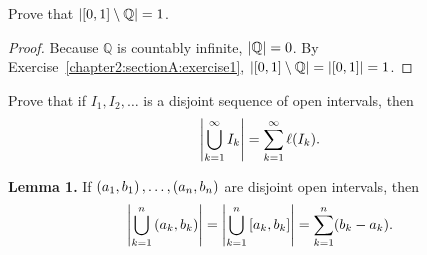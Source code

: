 \begin{exercise}\label{chapter2:sectionA:exercise10}
    Prove that $\left\vert{\left[{0, 1}\right]\setminus\mathbb{Q}}\right\vert = 1$.
\end{exercise}

\begin{proof}
    Because $\mathbb{Q}$ is countably infinite, $\left\vert{\mathbb{Q}}\right\vert = 0$. By Exercise~\ref{chapter2:sectionA:exercise1}, $\left\vert{\left[{0, 1}\right]\setminus\mathbb{Q}}\right\vert = \left\vert{\left[{0, 1}\right]}\right\vert = 1$.
\end{proof}
\newpage

\begin{exercise}\label{chapter2:sectionA:exercise11}
    Prove that if $I_{1}, I_{2}, \ldots$ is a disjoint sequence of open intervals, then
    \[
        \left\vert{\bigcup^{\infty}_{k=1}I_{k}}\right\vert = \sum^{\infty}_{k=1}\ell(I_{k}).
    \]
\end{exercise}

\noindent\textbf{Lemma 1.} If $\left({a_{1}, b_{1}}\right), \ldots, \left({a_{n}, b_{n}}\right)$ are disjoint open intervals, then
\[
    \left\vert{\bigcup^{n}_{k=1}\left({a_{k}, b_{k}}\right)}\right\vert = \left\vert{\bigcup^{n}_{k=1}\left[{a_{k}, b_{k}}\right]}\right\vert = \sum^{n}_{k=1}(b_{k} - a_{k}).
\]

